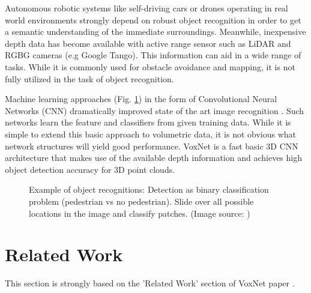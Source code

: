 \documentclass[10pt,twocolumn,letterpaper]{article}
\begin{document}
Autonomous robotic systems like self-driving cars or drones operating in real world environments strongly depend on robust object recognition
in order to get a semantic understanding of the immediate surroundings.
Meanwhile, inexpensive depth data has become available with active range sensor such as LiDAR and RGBG cameras (e.g Google Tango). 
This information can aid in a wide range of tasks. While it is commonly used for obstacle avoidance and mapping, it is not fully 
utilized in the task of object recognition.


Machine learning approaches (Fig. \ref{fig:obj_rec}) in the form of Convolutional Neural Networks (CNN) dramatically improved state 
of the art image recognition \cite{krizhevsky2012imagenet}. Such networks learn the feature and classifiers from given training data.
While it is simple to extend this basic approach to volumetric data, it is not obvious what network structures will yield good performance.
VoxNet \cite{voxnet} is a fast basic 3D CNN architecture that makes use of the available depth information and achieves high object detection accuracy for 
3D point clouds.


\begin{figure}[h]
	\centering
	\caption{Example of object recognitions: Detection as binary classification problem (pedestrian vs no pedestrian). Slide over all possible locations in the image and classify patches. 
	  (Image source: \cite{udacity})}
	\label{fig:obj_rec}
\end{figure}


\section{Related Work}

This section is strongly based on the 'Related Work' section of VoxNet paper \cite{voxnet}.
\end{document}
